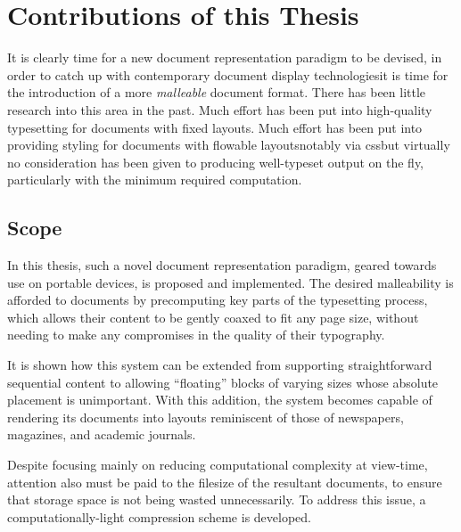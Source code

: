 \section{Contributions of this Thesis}

It is clearly time for a new document representation paradigm to be devised, in order to catch up with contemporary document display technologies\ed it is time for the introduction of a more \emph{malleable} document format. There has been little research into this area in the past. Much effort has been put into high-quality typesetting for documents with fixed layouts. Much effort has been put into providing styling for documents with flowable layouts\ed notably via css\ed but virtually no consideration has been given to producing well-typeset output on the fly, particularly with the minimum required computation.

\subsection{Scope}

In this thesis, such a novel document representation paradigm, geared towards use on portable devices, is proposed and implemented. The desired malleability is afforded to documents by precomputing key parts of the typesetting process, which allows their content to be gently coaxed to fit any page size, without needing to make any compromises in the quality of their typography.

It is shown how this system can be extended from supporting straightforward sequential content to allowing ``floating'' blocks of varying sizes whose absolute placement is unimportant. With this addition, the system becomes capable of rendering its documents into layouts reminiscent of those of newspapers, magazines, and academic journals.

Despite focusing mainly on reducing computational complexity at view-time, attention also must be paid to the filesize of the resultant documents, to ensure that storage space is not being wasted unnecessarily. To address this issue, a computationally-light compression scheme is developed.




